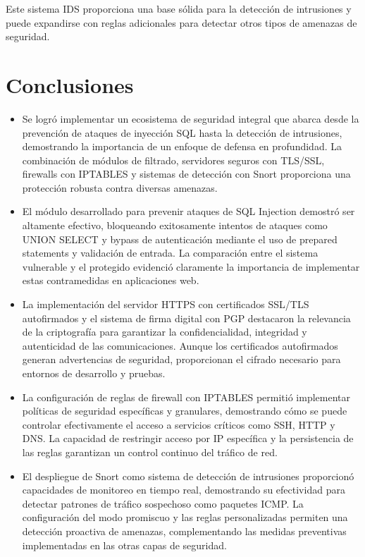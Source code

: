 \documentclass[12pt,a4paper]{article}
\begin{document}
Este sistema IDS proporciona una base sólida para la detección de intrusiones y
puede expandirse con reglas adicionales para detectar otros tipos de amenazas
de seguridad.

\section{Conclusiones}

\begin{itemize}
  \item Se logró implementar un ecosistema de seguridad integral que abarca desde la
        prevención de ataques de inyección SQL hasta la detección de intrusiones,
        demostrando la importancia de un enfoque de defensa en profundidad. La
        combinación de módulos de filtrado, servidores seguros con TLS/SSL, firewalls
        con IPTABLES y sistemas de detección con Snort proporciona una protección
        robusta contra diversas amenazas.
  \item El módulo desarrollado para prevenir ataques de SQL Injection demostró ser
        altamente efectivo, bloqueando exitosamente intentos de ataques como UNION
        SELECT y bypass de autenticación mediante el uso de prepared statements y
        validación de entrada. La comparación entre el sistema vulnerable y el
        protegido evidenció claramente la importancia de implementar estas
        contramedidas en aplicaciones web.
  \item La implementación del servidor HTTPS con certificados SSL/TLS autofirmados y el
        sistema de firma digital con PGP destacaron la relevancia de la criptografía
        para garantizar la confidencialidad, integridad y autenticidad de las
        comunicaciones. Aunque los certificados autofirmados generan advertencias de
        seguridad, proporcionan el cifrado necesario para entornos de desarrollo y
        pruebas.
  \item La configuración de reglas de firewall con IPTABLES permitió implementar
        políticas de seguridad específicas y granulares, demostrando cómo se puede
        controlar efectivamente el acceso a servicios críticos como SSH, HTTP y DNS. La
        capacidad de restringir acceso por IP específica y la persistencia de las
        reglas garantizan un control continuo del tráfico de red.
  \item El despliegue de Snort como sistema de detección de intrusiones proporcionó
        capacidades de monitoreo en tiempo real, demostrando su efectividad para
        detectar patrones de tráfico sospechoso como paquetes ICMP. La configuración
        del modo promiscuo y las reglas personalizadas permiten una detección proactiva
        de amenazas, complementando las medidas preventivas implementadas en las otras
        capas de seguridad.

\end{itemize}
\end{document}

